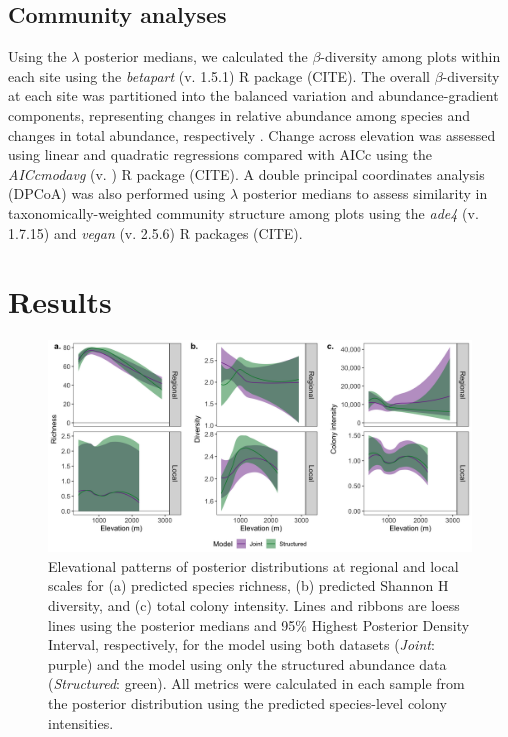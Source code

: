 \documentclass[preprint,review,times,12pt]{elsarticle}
\begin{document}
\subsection{Community analyses}
Using the $\lambda$ posterior medians, we calculated the $\beta$-diversity among plots within each site using the \emph{betapart} (v. 1.5.1) R package (CITE). The overall $\beta$-diversity at each site was partitioned into the balanced variation and abundance-gradient components, representing changes in relative abundance among species and changes in total abundance, respectively \citep{Baselga2017}. Change across elevation was assessed using linear and quadratic regressions compared with AICc using the \emph{AICcmodavg} (v. ) R package (CITE). A double principal coordinates analysis (DPCoA) was also performed using $\lambda$ posterior medians to assess similarity in taxonomically-weighted community structure among plots \citep{Dray2015,Pavoine2019} using the \emph{ade4} (v. 1.7.15) and \emph{vegan} (v. 2.5.6) R packages (CITE). 




\section{Results}
\label{S:3}
\begin{figure}
	\centering\includegraphics[width=6in]{ms/1_Ecography/1/figs/el_patterns.png}
	\caption{\label{fig:el_patterns} Elevational patterns of posterior distributions at regional and local scales for (a) predicted species richness, (b) predicted Shannon H diversity, and (c) total colony intensity. Lines and ribbons are loess lines using the posterior medians and 95\% Highest Posterior Density Interval, respectively, for the model using both datasets (\emph{Joint}: purple) and the model using only the structured abundance data (\emph{Structured}: green). All metrics were calculated in each sample from the posterior distribution using the predicted species-level colony intensities. }
\end{figure}
\end{document}
